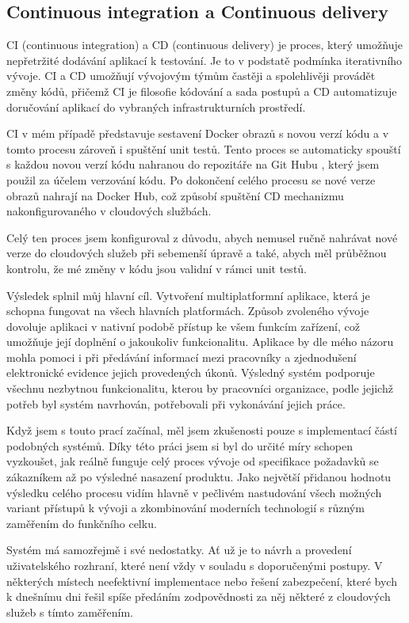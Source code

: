 \documentclass[
  glossaries,
]{kidiplom}
\begin{document}
\subsection{Continuous integration a Continuous delivery}
CI (continuous integration) a CD (continuous delivery) je proces, který umožňuje nepřetržité dodávání aplikací k testování. Je to v podstatě podmínka iterativního vývoje. CI a CD umožňují vývojovým týmům častěji a spolehlivěji provádět změny kódů, přičemž CI je filosofie kódování a sada postupů a CD automatizuje doručování aplikací do vybraných infrastrukturních prostředí. \cite{23}

CI v mém případě představuje sestavení Docker obrazů s novou verzí kódu a v tomto procesu zároveň i spuštění unit testů. Tento proces se automaticky spouští s každou novou verzí kódu nahranou do repozitáře na Git Hubu \cite{24}, který jsem použil za účelem verzování kódu. Po dokončení celého procesu se nové verze obrazů nahrají na Docker Hub, což způsobí spuštění CD mechanizmu nakonfigurovaného v cloudových službách.

Celý ten proces jsem konfiguroval z důvodu, abych nemusel ručně nahrávat nové verze do cloudových služeb při sebemenší úpravě a také, abych měl průběžnou kontrolu, že mé změny v kódu jsou validní v rámci unit testů.

\newpage

\begin{kiconclusions}
Výsledek splnil můj hlavní cíl. Vytvoření multiplatformní aplikace, která je schopna fungovat na všech hlavních platformách. Způsob zvoleného vývoje dovoluje aplikaci v nativní podobě přístup ke všem funkcím zařízení, což umožňuje její doplnění o jakoukoliv funkcionalitu. Aplikace by dle mého názoru mohla pomoci i při předávání informací mezi pracovníky a zjednodušení elektronické evidence jejich provedených úkonů. Výsledný systém podporuje všechnu nezbytnou funkcionalitu, kterou by pracovníci organizace, podle jejichž potřeb byl systém navrhován, potřebovali při vykonávání jejich práce.

Když jsem s touto prací začínal, měl jsem zkušenosti pouze s implementací částí podobných systémů. Díky této práci jsem si byl do určité míry schopen vyzkoušet, jak reálně funguje celý proces vývoje od specifikace požadavků se zákazníkem až po výsledné nasazení produktu. Jako největší přidanou hodnotu výsledku celého procesu vidím hlavně v pečlivém nastudování všech možných variant přístupů k vývoji a zkombinování moderních technologií s různým zaměřením do funkčního celku.

Systém má samozřejmě i své nedostatky. Ať už je to návrh a provedení uživatelského rozhraní, které není vždy v souladu s doporučenými postupy. V některých místech neefektivní implementace nebo řešení zabezpečení, které bych k dnešnímu dni řešil spíše předáním zodpovědnosti za něj některé z cloudových služeb s tímto zaměřením. 
\end{kiconclusions}
\end{document}
